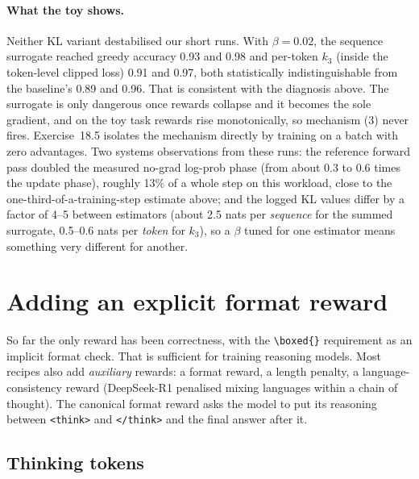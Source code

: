 \paragraph{What the toy shows.} Neither KL variant destabilised our short runs.
With $\beta=0.02$, the sequence surrogate reached greedy accuracy 0.93 and 0.98 and per-token
$k_3$ (inside the token-level clipped loss) 0.91 and 0.97, both statistically
indistinguishable from the baseline's 0.89 and 0.96. That is consistent with the diagnosis
above. The surrogate is only dangerous once rewards collapse and it becomes the sole
gradient, and on the toy task rewards rise monotonically, so mechanism (3) never fires.
Exercise~18.5 isolates the mechanism directly by training on a batch with zero advantages.
Two systems observations from these runs: the reference forward pass doubled the measured
no-grad log-prob phase (from about 0.3 to 0.6 times the update phase), roughly 13\% of a
whole step on this workload, close to the one-third-of-a-training-step estimate above; and the logged KL values differ by a factor of 4--5 between estimators
(about 2.5 nats per \emph{sequence} for the summed surrogate, 0.5--0.6 nats per \emph{token}
for $k_3$), so a $\beta$ tuned for one estimator means something very different for
another.


\section{Adding an explicit format reward}\label{sec:grpo2:format}

So far the only reward has been correctness, with the \verb|\boxed{}| requirement as an
implicit format check. That is sufficient for training reasoning models. Most recipes also add
\emph{auxiliary} rewards: a format reward, a length penalty, a language-consistency reward
(DeepSeek-R1 penalised mixing languages within a chain of thought). The canonical format
reward asks the model to put its reasoning between \verb|<think>| and \verb|</think>| and the
final answer after it.

\subsection{Thinking tokens}\label{sec:grpo2:think}

